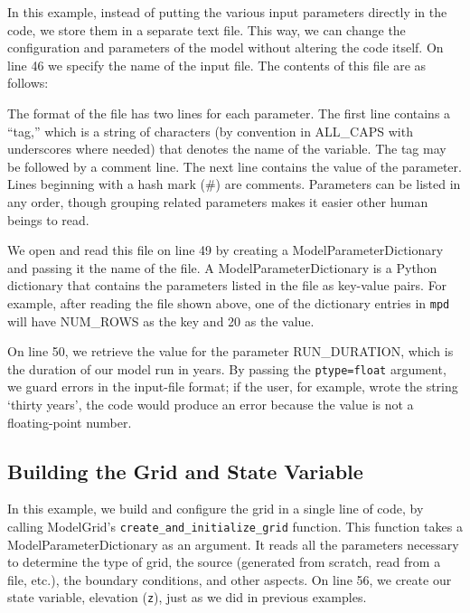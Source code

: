 \documentclass[12pt]{article}
\newcommand{\code}[1]{{\tt #1}}
\begin{document}


In this example, instead of putting the various input parameters directly in the code, we store them in a separate text file. This way, we can change the configuration and parameters of the model without altering the code itself. On line 46 we specify the name of the input file. The contents of this file are as follows:



The format of the file has two lines for each parameter. The first line contains a ``tag,'' which is a string of characters (by convention in ALL\_CAPS with underscores where needed) that denotes the name of the variable. The tag may be followed by a comment line. The next line contains the value of the parameter. Lines beginning with a hash mark (\#) are comments. Parameters can be listed in any order, though grouping related parameters makes it easier other human beings to read.

We open and read this file on line 49 by creating a ModelParameterDictionary and passing it the name of the file. A ModelParameterDictionary is a Python dictionary that contains the parameters listed in the file as key-value pairs. For example, after reading the file shown above, one of the dictionary entries in \code{mpd} will have NUM\_ROWS as the key and 20 as the value. 

On line 50, we retrieve the value for the parameter RUN\_DURATION, which is the duration of our model run in years. By passing the \code{ptype=float} argument, we guard errors in the input-file format; if the user, for example, wrote the string `thirty years', the code would produce an error because the value is not a floating-point number.

\subsection{Building the Grid and State Variable}



In this example, we build and configure the grid in a single line of code, by calling ModelGrid's \code{create\_and\_initialize\_grid} function. This function takes a ModelParameterDictionary as an argument. It reads all the parameters necessary to determine the type of grid, the source (generated from scratch, read from a file, etc.), the boundary conditions, and other aspects. On line 56, we create our state variable, elevation (\code{z}), just as we did in previous examples.
\end{document}
